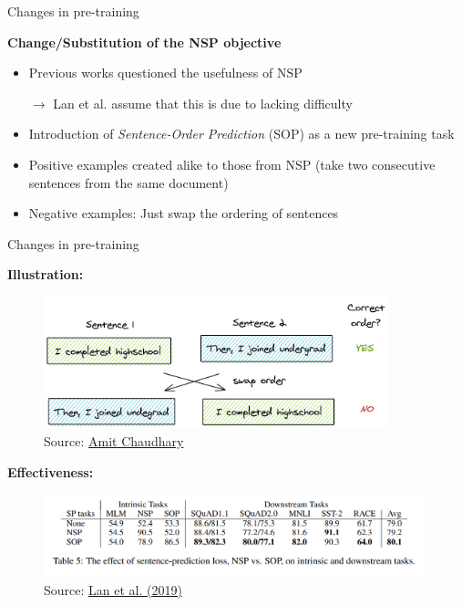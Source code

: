 
\begin{frame}{Changes in pre-training}

\vfill

	\textbf{Change/Substitution of the NSP objective}
		
	\begin{itemize}
			\item Previous works questioned the usefulness of NSP
			\item[$\to$] Lan et al. assume that this is due to lacking difficulty
			\item Introduction of \textit{Sentence-Order Prediction} (SOP) as a new pre-training task
			\item Positive examples created alike to those from NSP (take two consecutive sentences from the same document)
			\item Negative examples: Just swap the ordering of sentences
	\end{itemize}

\vfill

\end{frame}


\begin{frame}{Changes in pre-training}

\vfill

	\textbf{Illustration:}
		
	\begin{figure}
		\centering
		\includegraphics[width = 10cm]{figure/albert-sop.png}\\ 
		\footnotesize{Source:} \href{https://amitness.com/2020/02/albert-visual-summary/}{\footnotesize Amit Chaudhary}
	\end{figure}

	\textbf{Effectiveness:}
		
	\begin{figure}
		\centering
		\includegraphics[width = 11cm]{figure/albert-sop-ablation.png}\\ 
		\footnotesize{Source:} \href{https://arxiv.org/pdf/1909.11942.pdf}{\footnotesize Lan et al. (2019)}
	\end{figure}

\vfill

\end{frame}

